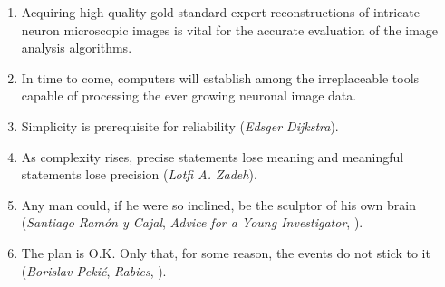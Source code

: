 \documentclass[10pt]{report}
\begin{document}
\begin{enumerate}
\medskip
\item Acquiring high quality gold standard expert reconstructions of intricate neuron microscopic images is vital for the accurate evaluation of the image analysis algorithms.

\medskip 

\item In time to come, computers will establish among the irreplaceable tools capable of processing the ever growing neuronal image data. 

\medskip
  
\item Simplicity is prerequisite for reliability (\emph{Edsger Dijkstra}).

\medskip

\item As complexity rises, precise statements lose meaning and meaningful statements lose precision (\emph{Lotfi A. Zadeh}).

\medskip

\item Any man could, if he were so inclined, be the sculptor of his own brain (\emph{Santiago Ram\'{o}n y Cajal}, \emph{Advice for a Young Investigator}, ).

\medskip

\item The plan is O.K. Only that, for some reason, the events do not stick to it (\emph{Borislav Peki\'{c}}, \emph{Rabies}, ).

\end{enumerate}

\end{document}
